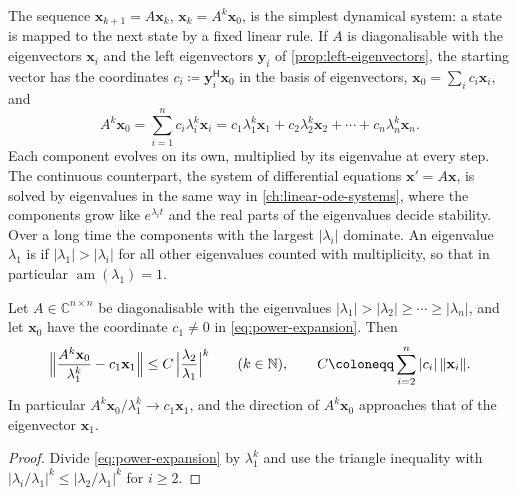 The sequence $\mathbf x_{k+1}=A\mathbf x_k$, $\mathbf x_k=A^k\mathbf x_0$, is the simplest dynamical system: a state is mapped to the next state by a fixed linear rule. If $A$ is diagonalisable with the eigenvectors $\mathbf x_i$ and the left eigenvectors $\mathbf y_i$ of \cref{prop:left-eigenvectors}, the starting vector has the coordinates $c_i\coloneqq\mathbf y_i^{\mathsf H}\mathbf x_0$ in the basis of eigenvectors, $\mathbf x_0=\sum_ic_i\mathbf x_i$, and
\begin{equation}
A^k\mathbf x_0=\sum_{i=1}^nc_i\lambda_i^k\mathbf x_i=c_1\lambda_1^k\mathbf x_1+c_2\lambda_2^k\mathbf x_2+\cdots+c_n\lambda_n^k\mathbf x_n .
\label{eq:power-expansion}
\end{equation}
Each component evolves on its own, multiplied by its eigenvalue at every step. The continuous counterpart, the system of differential equations $\mathbf x'=A\mathbf x$, is solved by eigenvalues in the same way in \cref{ch:linear-ode-systems}, where the components grow like $e^{\lambda_it}$ and the real parts of the eigenvalues decide stability. Over a long time the components with the largest $|\lambda_i|$ dominate. An eigenvalue $\lambda_1$ is  if $|\lambda_1|>|\lambda_i|$ for all other eigenvalues counted with multiplicity, so that in particular $\operatorname{am}(\lambda_1)=1$.

\begin{proposition}
\label{prop:dominant}
Let $A\in\mathbb C^{n\times n}$ be diagonalisable with the eigenvalues $|\lambda_1|>|\lambda_2|\ge\cdots\ge|\lambda_n|$, and let $\mathbf x_0$ have the coordinate $c_1\ne0$ in \eqref{eq:power-expansion}. Then
\[
\Bigl\|\frac{A^k\mathbf x_0}{\lambda_1^k}-c_1\mathbf x_1\Bigr\|\le C\,\Bigl|\frac{\lambda_2}{\lambda_1}\Bigr|^k\qquad(k\in\mathbb N),\qquad C\coloneqq\sum_{i=2}^n|c_i|\,\|\mathbf x_i\| .
\]
In particular $A^k\mathbf x_0/\lambda_1^k\to c_1\mathbf x_1$, and the direction of $A^k\mathbf x_0$ approaches that of the eigenvector $\mathbf x_1$.
\end{proposition}

\begin{proof}
Divide \eqref{eq:power-expansion} by $\lambda_1^k$ and use the triangle inequality with $|\lambda_i/\lambda_1|^k\le|\lambda_2/\lambda_1|^k$ for $i\ge2$.
\end{proof}

